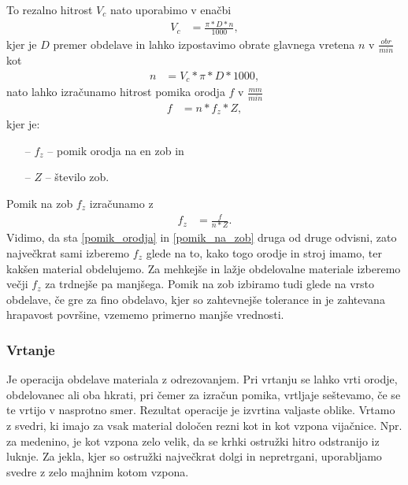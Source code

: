 To rezalno hitrost \(V_c\) nato uporabimo v enačbi
\begin{equation}
	\begin{split}
		V_c &= \frac{\pi*D*n}{1000},
	\end{split}
\end{equation}
kjer je \(D\) premer obdelave in lahko izpostavimo obrate glavnega
vretena \(n\) v \(\frac{obr}{min}\) kot
\begin{equation}
	\begin{split}
		n &= V_c * \pi * D * 1000,
	\end{split}
\end{equation}
nato lahko izračunamo hitrost pomika orodja \(f\) v \(\frac{mm}{min}\)
\begin{equation}
	\label{pomik_orodja}
	\begin{split}
		f &= n * f_z * Z,
	\end{split}
\end{equation}
kjer je:
\begin{itemize}
	\item[--] \(f_z\) -- pomik orodja na en zob in
	\item[--] \(Z\) -- število zob.
\end{itemize}
Pomik na zob \(f_z\) izračunamo z
\begin{equation}
	\label{pomik_na_zob}
	\begin{split}
		f_z &= \frac{f}{n * Z}.
	\end{split}
\end{equation}
Vidimo, da sta \eqref{pomik_orodja} in \eqref{pomik_na_zob} druga od
druge odvisni, zato največkrat sami izberemo \(f_z\) glede na to,
kako togo orodje in stroj imamo, ter kakšen material obdelujemo.
Za mehkejše in lažje obdelovalne materiale izberemo večji \(f_z\)
za trdnejše pa manjšega. Pomik na zob izbiramo tudi glede na vrsto obdelave,
če gre za fino obdelavo, kjer so zahtevnejše tolerance in je zahtevana
hrapavost površine, vzememo primerno manjše vrednosti.

\subsubsection{Vrtanje}
Je operacija obdelave materiala z odrezovanjem.
Pri vrtanju se lahko vrti orodje, obdelovanec ali oba hkrati,
pri čemer za izračun pomika, vrtljaje seštevamo, če se te vrtijo
v nasprotno smer. Rezultat operacije je izvrtina valjaste oblike.
Vrtamo z svedri, ki imajo za vsak material določen rezni kot in kot vzpona
vijačnice. Npr. za medenino, je kot vzpona zelo velik, da se
krhki ostružki hitro odstranijo iz luknje. Za jekla, kjer so
ostružki največkrat dolgi in nepretrgani, uporabljamo svedre z
zelo majhnim kotom vzpona.

